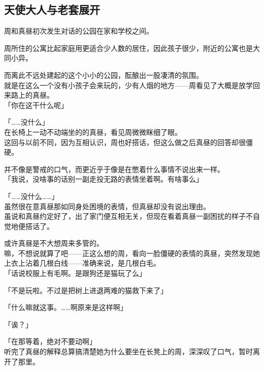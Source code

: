 \subsection{天使大人与老套展开}

周和真昼初次发生对话的公园在家和学校之间。

周所住的公寓比起家庭用更适合少人数的居住，因此孩子很少，附近的公寓也是大同小异。

而离此不远处建起的这个小小的公园，酝酿出一股凄清的氛围。\\

就是在这么一个没有小孩子会来玩的，少有人烟的地方——周看见了大概是放学回来路上的真昼。\\

「你在这干什么呢」

「……没什么」\\

在长椅上一动不动端坐的的真昼，看见周微微眯细了眼。\\

这回与以前不同，因为互相认识，周也好搭话，但这么做之后真昼的回答却很僵硬。

并不像是警戒的口气，而更近乎于像是在憋着什么事情不说出来一样。\\

「我说，没啥事的话别一副走投无路的表情坐着啊。有啥事么」

「……没什么……」\\

虽然很在意真昼那如同身处困境的表情，但真昼却没有说出理由。\\

虽说和真昼约定好了，出了家门便互相无关，但现在看着真昼一副困扰的样子不自觉地便搭话了。

或许真昼是不大想周来多管的。\\

嘛，不想说就算了吧——正这么想的周，看向一脸僵硬的表情的真昼，突然发现她上衣上沾着几根白线——准确来说，是几根白毛。\\

「话说校服上有毛啊。是跟狗还是猫玩了么」

「不是玩啦。不过是把树上进退两难的猫救下来了」

「什么嘛就这事。……啊原来是这样啊」

「诶？」

「在那等着，绝对不要动啊」\\

听完了真昼的解释总算搞清楚她为什么要坐在长凳上的周，深深叹了口气，暂时离开了那里。\\

